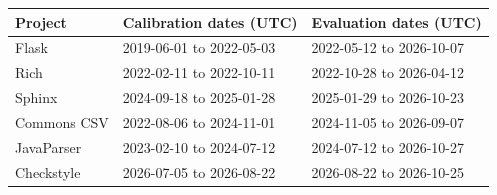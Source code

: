 \begin{tabular}{lll}
\toprule
Project & Calibration dates (UTC) & Evaluation dates (UTC) \\
\midrule
Flask & 2019-06-01 to 2022-05-03 & 2022-05-12 to 2026-10-07 \\
Rich & 2022-02-11 to 2022-10-11 & 2022-10-28 to 2026-04-12 \\
Sphinx & 2024-09-18 to 2025-01-28 & 2025-01-29 to 2026-10-23 \\
Commons CSV & 2022-08-06 to 2024-11-01 & 2024-11-05 to 2026-09-07 \\
JavaParser & 2023-02-10 to 2024-07-12 & 2024-07-12 to 2026-10-27 \\
Checkstyle & 2026-07-05 to 2026-08-22 & 2026-08-22 to 2026-10-25 \\
\bottomrule
\end{tabular}
